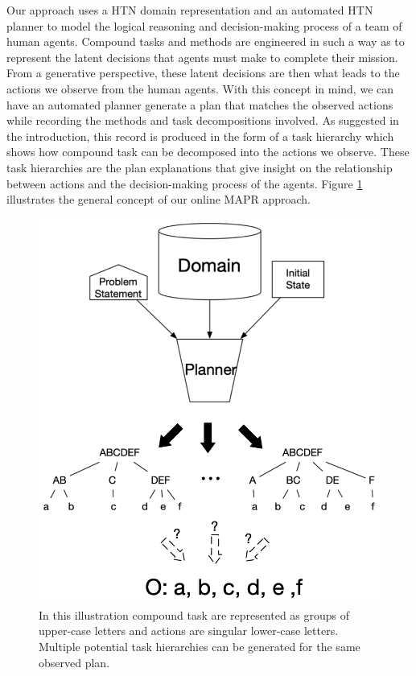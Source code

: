 Our approach uses a HTN domain representation and an automated HTN planner to model the logical reasoning and decision-making process of a team of human agents. Compound tasks and methods are engineered in such a way as to represent the latent decisions that agents must make to complete their mission. From a generative perspective, these latent decisions are then what leads to the actions we observe from the human agents. With this concept in mind, we can have an automated planner generate a plan that matches the observed actions while recording the methods and task decompositions involved. As suggested in the introduction, this record is produced in the form of a task hierarchy which shows how compound task can be decomposed into the actions we observe. These task hierarchies are the plan explanations that give insight on the relationship between actions and the decision-making process of the agents. Figure \ref{pr_fig:2} illustrates the general concept of our online MAPR approach.

\begin{figure}[h]
    \centering
    \includegraphics[width=1\textwidth]{images/pr_as_planning}
    \caption{In this illustration compound task are represented as groups of upper-case letters and actions are singular lower-case letters. Multiple potential task hierarchies can be generated for the same observed plan.} 
    \label{pr_fig:2}
\end{figure}

